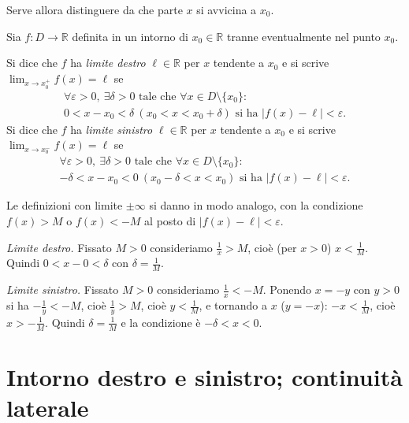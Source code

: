 \documentclass[11pt,a4paper]{article}
\begin{document}
Serve allora distinguere da che parte $x$ si avvicina a $x_0$.

\begin{definizione}
Sia $f : D \to \mathbb{R}$ definita in un intorno di $x_0 \in \mathbb{R}$ tranne eventualmente nel punto $x_0$.

Si dice che $f$ ha \emph{limite destro} $\ell \in \mathbb{R}$ per $x$ tendente a $x_0$ e si scrive $\displaystyle\lim_{x\to x_0^+} f(x) = \ell$ se
\begin{gather*}
\forall \varepsilon > 0,\ \exists \delta > 0 \text{ tale che } \forall x \in D \setminus \{x_0\} : \\ 0 < x - x_0 < \delta \ (x_0 < x < x_0 + \delta) \text{ si ha } |f(x) - \ell| < \varepsilon .
\end{gather*}
Si dice che $f$ ha \emph{limite sinistro} $\ell \in \mathbb{R}$ per $x$ tendente a $x_0$ e si scrive $\displaystyle\lim_{x\to x_0^-} f(x) = \ell$ se
\begin{gather*}
\forall \varepsilon > 0,\ \exists \delta > 0 \text{ tale che } \forall x \in D \setminus \{x_0\} : \\ -\delta < x - x_0 < 0 \ (x_0 - \delta < x < x_0) \text{ si ha } |f(x) - \ell| < \varepsilon .
\end{gather*}
\end{definizione}

Le definizioni con limite $\pm\infty$ si danno in modo analogo, con la condizione $f(x) > M$ o $f(x) < -M$ al posto di $|f(x) - \ell| < \varepsilon$.

\begin{esempio}[$\lim_{x\to 0^+}\frac{1}{x} = +\infty$ e $\lim_{x\to 0^-}\frac{1}{x} = -\infty$]
\emph{Limite destro.} Fissato $M > 0$ consideriamo $\frac{1}{x} > M$, cioè (per $x > 0$) $x < \frac{1}{M}$. Quindi $0 < x - 0 < \delta$ con $\delta = \frac{1}{M}$.

\emph{Limite sinistro.} Fissato $M > 0$ consideriamo $\frac{1}{x} < -M$. Ponendo $x = -y$ con $y > 0$ si ha $-\frac{1}{y} < -M$, cioè $\frac{1}{y} > M$, cioè $y < \frac{1}{M}$, e tornando a $x$ ($y = -x$): $-x < \frac{1}{M}$, cioè $x > -\frac{1}{M}$. Quindi $\delta = \frac{1}{M}$ e la condizione è $-\delta < x < 0$.
\end{esempio}

\section{Intorno destro e sinistro; continuità laterale}
\end{document}
